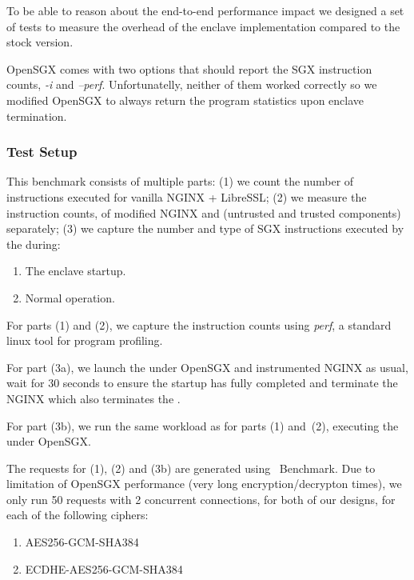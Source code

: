 \documentclass[../../../main.tex]{subfiles}
\begin{document}
\label{sec:cpu-instr-analysis}
To be able to reason about the end-to-end performance impact we designed a set
of tests to measure the overhead of the enclave implementation compared to the
stock version.


OpenSGX comes with two options that should report the SGX instruction counts,
\textit{-i} and \textit{--perf}. Unfortunatelly, neither of them worked
correctly so we modified OpenSGX to always return the program statistics upon
enclave termination.

\subsubsection*{Test Setup}
This benchmark consists of multiple parts: (1) we count the number of
instructions executed for vanilla NGINX + LibreSSL; (2) we measure the
instruction counts, of modified NGINX and \enclavemodel (untrusted and trusted
components) separately; (3) we capture the number and type of SGX instructions
executed by the \enclaveprogram during:
\begin{enumerate}
  \item The enclave startup.
  \item Normal operation.
\end{enumerate}

For parts (1) and (2), we capture the instruction counts using \textit{perf},
a standard linux tool for program profiling.

For part (3a), we launch the \enclaveprogram under OpenSGX and instrumented
NGINX as usual, wait for 30 seconds to ensure the startup has fully completed
and terminate the NGINX which also terminates the \enclaveprogram.

For part (3b), we run the same workload as for parts (1) and~(2), executing
the \enclaveprogram under OpenSGX.

The requests for (1), (2) and (3b) are generated using \Apache~Benchmark. Due
to limitation of OpenSGX performance (very long encryption/decrypton times),
we only run 50 requests with 2 concurrent connections, for both of our
designs, for each of the following ciphers:
\begin{enumerate}
  \item AES256-GCM-SHA384
  \item ECDHE-AES256-GCM-SHA384
\end{enumerate}
\end{document}
